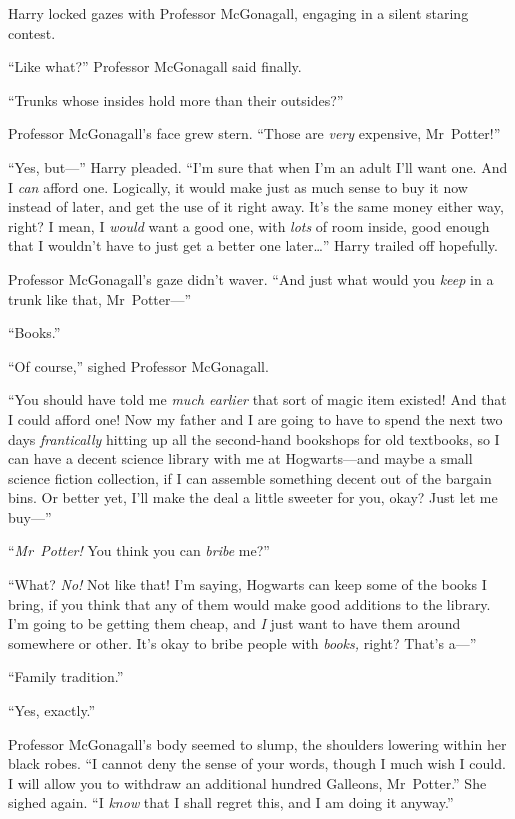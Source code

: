Harry locked gazes with Professor McGonagall, engaging in a silent staring contest.

“Like what?” Professor McGonagall said finally.

“Trunks whose insides hold more than their outsides?”

Professor McGonagall’s face grew stern. “Those are \emph{very} expensive, Mr~Potter!”

“Yes, but---” Harry pleaded. “I’m sure that when I’m an adult I’ll want one. And I \emph{can} afford one. Logically, it would make just as much sense to buy it now instead of later, and get the use of it right away. It’s the same money either way, right? I mean, I \emph{would} want a good one, with \emph{lots} of room inside, good enough that I wouldn’t have to just get a better one later…” Harry trailed off hopefully.

Professor McGonagall’s gaze didn’t waver. “And just what would you \emph{keep} in a trunk like that, Mr~Potter---”

“Books.”

“Of course,” sighed Professor McGonagall.

“You should have told me \emph{much earlier} that sort of magic item existed! And that I could afford one! Now my father and I are going to have to spend the next two days \emph{frantically} hitting up all the second-hand bookshops for old textbooks, so I can have a decent science library with me at Hogwarts---and maybe a small science fiction collection, if I can assemble something decent out of the bargain bins. Or better yet, I’ll make the deal a little sweeter for you, okay? Just let me buy---”

“\emph{Mr~Potter!} You think you can \emph{bribe} me?”

“What? \emph{No!} Not like that! I’m saying, Hogwarts can keep some of the books I bring, if you think that any of them would make good additions to the library. I’m going to be getting them cheap, and \emph{I} just want to have them around somewhere or other. It’s okay to bribe people with \emph{books,} right? That’s a---”

“Family tradition.”

“Yes, exactly.”

Professor McGonagall’s body seemed to slump, the shoulders lowering within her black robes. “I cannot deny the sense of your words, though I much wish I could. I will allow you to withdraw an additional hundred Galleons, Mr~Potter.” She sighed again. “I \emph{know} that I shall regret this, and I am doing it anyway.”

